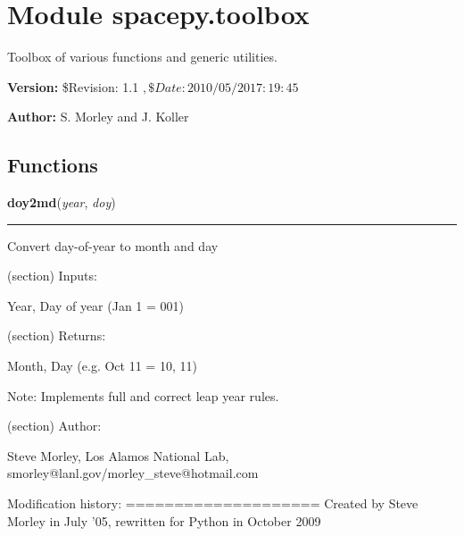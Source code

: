 %
%
%


\section{Module spacepy.toolbox}

    \label{spacepy:toolbox}
Toolbox of various functions and generic utilities.

\textbf{Version:} \$Revision: 1.1 $, \$Date: 2010/05/20 17:19:45 $



\textbf{Author:} S. Morley and J. Koller





  \subsection{Functions}

    \label{spacepy:toolbox:doy2md}

    \vspace{0.5ex}

\hspace{.8\funcindent}\begin{boxedminipage}{\funcwidth}

    \raggedright \textbf{doy2md}(\textit{year}, \textit{doy})

    \vspace{-1.5ex}

    \rule{\textwidth}{0.5\fboxrule}
\setlength{\parskip}{2ex}
    Convert day-of-year to month and day

    (section) Inputs:

      Year, Day of year (Jan 1 = 001)

    (section) Returns:

      Month, Day (e.g. Oct 11 = 10, 11)

      Note: Implements full and correct leap year rules.

    (section) Author:

      Steve Morley, Los Alamos National Lab, 
      smorley@lanl.gov/morley\_steve@hotmail.com

      Modification history: ==================== Created by Steve Morley in
      July '05, rewritten for Python in October 2009

\setlength{\parskip}{1ex}
    \end{boxedminipage}

